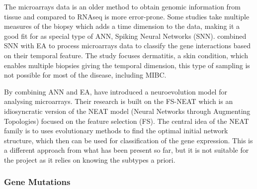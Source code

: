 The microarrays data is an older method to obtain genomic information from tissue and compared to RNAseq is more error-prone. Some studies take multiple measures of the biopsy which adds a time dimension to the data, making it a good fit for as special type of ANN, Spiking Neural Networks (SNN). \citet{Capecci2020-uj} combined SNN with EA to process microarrays data to classify the gene interactions based on their temporal feature. The study focuses dermatitis, a skin condition, which enables multiple biopsies giving the temporal dimension, this type of sampling is not possible for most of the disease, including MIBC.

By combining ANN and EA, \citet{Grisci2019-xn} have introduced a neuroevolution model for analysing microarrays. Their research is built on the FS-NEAT\cite{Whiteson2005-dn} which is an idiosyncratic version of the NEAT model (Neural Networks through Augmenting Topologies)\cite{Stanley2002-tg} focused on the feature selection (FS). The central idea of the NEAT family is to uses evolutionary methods to find the optimal initial network structure, which then can be used for classification of the gene expression. This is a different approach from what has been present so far, but it is not suitable for the project as it relies on knowing the subtypes a priori.

\subsubsection{Gene Mutations} \label{s:lit:mutations}

\vspace{3mm}
\vspace{3mm}


